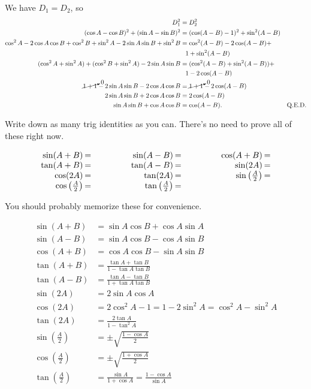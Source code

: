 \documentclass[../gatm_answers.tex]{subfiles}
\begin{document}
\noindent We have $D_1=D_2$, so
\begin{align*}
D_1^2&=D_2^2 \\
(\cos A - \cos B)^2 + (\sin A - \sin B)^2 &= (\cos(A-B)-1)^2+\sin^2 (A-B) \\
\cos^2 A - 2\cos A\cos B + \cos^2 B + \sin^2 A - 2\sin A\sin B + \sin^2 B &= \cos^2 (A-B) - 2\cos(A-B) + \\ &\phantom{=} 1+\sin^2(A-B) \\
(\cos^2 A + \sin^2 A) + (\cos^2 B + \sin^2 A) - 2\sin A\sin B &= (\cos^2 (A-B) + \sin^2(A-B)) + \\ &\phantom{=} 1 - 2\cos(A-B) \\
\cancelto{0}{1 + 1} - 2\sin A\sin B - 2\cos A\cos B &= \cancelto{0}{1 + 1} - 2\cos(A-B) \\
2\sin A\sin B + 2\cos A\cos B &= 2\cos(A-B) \\
\sin A\sin B + \cos A\cos B &= \cos(A-B). & \text{Q.E.D.} \\
\end{align*}

\begin{outer_problem}
\item Write down as many trig identities as you can. There's no need to prove all of these right now.

\renewcommand{\arraystretch}{1.1}
$$\arraycolsep=1pt\begin{array}{rlrlrl}
\sin(A+B)&=\qquad\qquad\phantom{.}&\sin(A-B) &=\qquad\qquad\phantom{.}&\cos(A+B) &= \\
\tan(A+B)&= &\tan(A-B) &= &\sin(2A) &= \\
\cos(2A)&= &\tan(2A) &= &\sin\left(\frac{A}{2}\right) &= \\
\cos\left(\frac{A}{2}\right)&= &\tan\left(\frac{A}{2}\right) &= & & \\
\end{array}$$
\end{outer_problem}

\noindent You should probably memorize these for convenience.

\renewcommand{\arraystretch}{1.1}
\begin{align*}
\sin(A+B)&= \sin A \cos B + \cos A \sin A \\
\sin(A-B) &= \sin A \cos B - \cos A \sin B \\
\cos(A+B) &= \cos A \cos B - \sin A \sin B \\
\tan(A+B)&= \frac{\tan A + \tan B}{1-\tan A\tan B}\\
\tan(A-B) &= \frac{\tan A - \tan B}{1+\tan A\tan B}\\
\sin(2A) &= 2\sin A\cos A\\
\cos(2A)&= 2\cos^2 A - 1 = 1 - 2\sin^2 A = \cos^2 A - \sin^2 A \\
\tan(2A) &= \frac{2\tan A}{1-\tan^2 A}\\
\sin\left(\frac{A}{2}\right) &= \pm\sqrt{\frac{1-\cos A}{2}}\\
\cos\left(\frac{A}{2}\right)&= \pm\sqrt{\frac{1+\cos A}{2}}\\
\tan\left(\frac{A}{2}\right) &= \frac{\sin A}{1+\cos A} = \frac{1-\cos A}{\sin A}
\end{align*}
\end{document}

